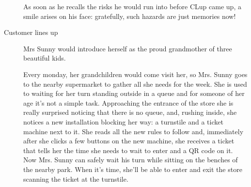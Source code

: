 \begin{description}
    As soon as he recalls the risks he would run into before CLup came up, a smile arises on his face: gratefully, such hazards are just memories now!


    \item[Customer lines up]
    Mrs Sunny would introduce herself as the proud grandmother of three beautiful kids.
         
    Every monday, her grandchildren would come visit her, so  Mrs. Sunny goes to the nearby supermarket to gather all she needs for the week. She is used to waiting for her turn standing outside in a queue and for someone of her age it's not a simple task. Approaching the entrance of the store she is really surprised noticing that there is no queue, and, rushing inside, she notices a new installation blocking her way: a turnstile and a ticket machine next to it. She reads all the new rules to follow and, immediately after she clicks a few buttons on the new machine, she receives a ticket that tells her the time she needs to wait to enter and a QR code on it. Now Mrs. Sunny can safely wait his turn while sitting on the benches of the nearby park. When it’s time, she'll be able to enter and exit the store scanning the ticket at the turnstile.



\end{description}
